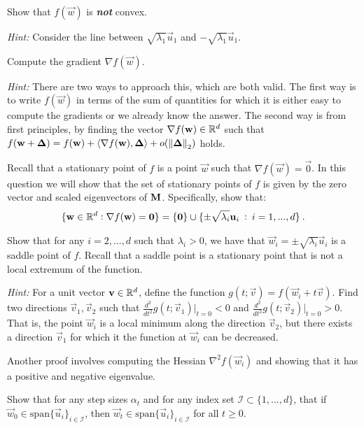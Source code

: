 \documentclass[preview]{standalone}
\begin{document}
\begin{Parts}

\Part Show that $f(\vec{w})$ is \textbf{\emph{not}} convex.

\emph{Hint:} Consider the line
between $\sqrt{\lambda_1} \vec{u}_1$ and $-\sqrt{\lambda_1} \vec{u}_1$.



\Part Compute the gradient $\nabla f(\vec{w})$.

\emph{Hint:} There are two ways to approach this, which are both valid.
The first way is to write $f(\vec{w})$ in terms of the sum of quantities for which
it is either easy to compute the gradients or we already know the answer.
The second way is from first principles, by
finding the vector $\nabla f(\boldsymbol{\mathbf{w}}) \in \mathbb{R}^d$ such that
$f(\boldsymbol{\mathbf{w}} + \boldsymbol{\mathbf{\Delta}}) = f(\boldsymbol{\mathbf{w}}) + \langle \nabla f(\boldsymbol{\mathbf{w}}), \boldsymbol{\mathbf{\Delta}} \rangle + o(\norm{\boldsymbol{\mathbf{\Delta}}}_2)$ holds.



\Part
Recall that a stationary point of $f$ is a point $\vec{w}$ such that $\nabla f(\vec{w}) = \vec{0}$.
In this question we will show that the set of stationary points of $f$ is given by the zero vector and
scaled eigenvectors of $\mathbf{M}$. Specifically, show that:
\begin{align*}
  \{ \boldsymbol{\mathbf{w}} \in \mathbb{R}^d : \nabla f(\boldsymbol{\mathbf{w}}) = \boldsymbol{\mathbf{0}} \} = \{\boldsymbol{\mathbf{0}}\} \cup \{ \pm \sqrt{\lambda_i} \boldsymbol{\mathbf{u}}_i \: : \: i=1, ..., d \} \:.
\end{align*}



\Part Show that for any $i=2, ..., d$ such that $\lambda_i > 0$, we have that
$\vec{w}_i = \pm \sqrt{\lambda_i} \vec{u}_i$ is a saddle point of $f$.
Recall that a saddle point is a stationary point that is not a local extremum of the function.

\emph{Hint:} For a unit vector $\boldsymbol{\mathbf{v}} \in \mathbb{R}^d$, define the function $g(t; \vec{v}) = f( \vec{w}_i + t \vec{v})$.
Find two directions $\vec{v}_1, \vec{v}_2$ such that $\frac{d^2}{dt^2} g(t; \vec{v}_1) \bigg|_{t=0} < 0$
and $\frac{d^2}{dt^2} g(t; \vec{v}_2) \bigg|_{t=0} > 0$. That is,
the point $\vec{w}_i$ is a local minimum along the direction $\vec{v}_2$,
but there exists a direction $\vec{v}_1$ for which it the function at $\vec{w}_i$ can be decreased.

Another proof involves computing the Hessian $\nabla^2 f(\vec{w}_i)$ and showing that it has
a positive and negative eigenvalue.



\Part Show that for any step sizes $\alpha_t$ and for any index set $\mathcal{I} \subset \{1, ..., d\}$, that
if $\vec{w}_0 \in \mathrm{span}\{ \vec{u}_i \}_{i \in \mathcal{I}}$, then
$\vec{w}_t \in \mathrm{span}\{ \vec{u}_i \}_{i \in \mathcal{I}}$ for all $t \geq 0$.




\end{Parts}
\end{document}
